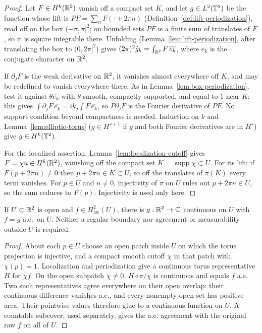 \begin{proof}
\leanok
Let $F\in H^k(\mathbb{R}^2)$ vanish off a compact set $K$, and let $g\in L^2(\mathbb{T}^2)$ be the function whose lift is
$PF=\sum_n F(\cdot+2\pi n)$ (Definition~\ref{def:lift-periodization}), read off on the box
$(-\pi,\pi]^2$; on bounded sets $PF$ is a finite sum of translates of $F$, so it is square
integrable there. Unfolding (Lemma~\ref{lem:lift-periodization}, after translating the box to
$(0,2\pi]^2$) gives
$(2\pi)^2\hat g_k=\int_{\mathbb{R}^2}F\,\overline{e_k}$, where $\overline{e_k}$ is the conjugate character
on $\mathbb{R}^2$.

If $\partial_jF$ is the weak derivative on $\mathbb{R}^2$, it vanishes almost everywhere off $K$, and
may be redefined to vanish everywhere there. As in Lemma~\ref{lem:box-periodization}, test
it against $\theta\overline{e_k}$ with $\theta$ smooth, compactly supported, and equal to $1$
near $K$: this gives $\int\partial_jF\,\overline{e_k}=ik_j\int F\,\overline{e_k}$, so
$P\partial_jF$ is the Fourier derivative of $PF$. No support condition beyond compactness
is needed. Induction on $k$ and Lemma~\ref{lem:elliptic-torus} ($g\in H^{s+1}$ if $g$ and
both Fourier derivatives are in $H^s$) give $g\in H^k(\mathbb{T}^2)$.

For the localized assertion, Lemma~\ref{lem:localization-cutoff} gives
$F=\chi u\in H^k(\mathbb{R}^2)$, vanishing off the compact set
$K=\operatorname{supp}\chi\subset U$.
For its lift: if $F(p+2\pi n)\ne0$ then $p+2\pi n\in K\subset U$, so off the translates of
$\pi(K)$ every term vanishes. For $p\in U$ and $n\ne0$, injectivity of $\pi$ on $U$ rules out
$p+2\pi n\in U$, so the sum reduces to $F(p)$. Injectivity is used only here.
\end{proof}

\begin{lemma}
\label{lem:local-h2-continuous-representative}
\leanok
If $U\subset\mathbb{R}^2$ is open and $f\in H^2_{\mathrm{loc}}(U)$, there is
$g:\mathbb{R}^2\to\mathbb{C}$ continuous on $U$ with $f=g$ a.e.\ on $U$.
Neither a regular boundary nor agreement or measurability outside $U$
is required.
\end{lemma}

\begin{proof}
\leanok
About each $p\in U$ choose an open patch inside $U$ on which the torus
projection is injective, and a compact smooth cutoff $\chi$ in that patch
with $\chi(p)=1$. Localization and periodization give a continuous torus
representative $H$ for $\chi f$. On the open subpatch $\chi\ne0$,
$H\circ\pi/\chi$ is continuous and equals $f$ a.e.
Two such representatives agree everywhere on their open overlap: their
continuous difference vanishes a.e., and every nonempty open set has
positive area. Their pointwise values therefore glue to a continuous
function on $U$. A countable subcover, used separately, gives the a.e.
agreement with the original raw $f$ on all of $U$.
\end{proof}

